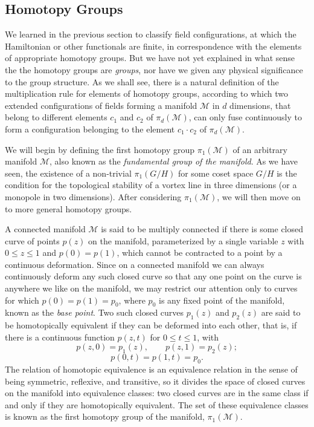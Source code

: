 \subsection{Homotopy Groups}
\label{sec:23.2}

We learned in the previous section to classify field configurations, at
which the Hamiltonian or other functionals are finite, in correspondence
with the elements of appropriate homotopy groups. But we have not yet
explained in what sense the the homotopy groups are \emph{groups}, nor have
we given any physical significance to the group structure. As we shall see,
there is a natural definition of the multiplication rule for elements of
homotopy groups, according to which two extended configurations of fields
forming a manifold $\mathcal M$ in $d$ dimensions, that belong to different
elements $c_1$ and $c_2$ of $\pi_d(\mathcal M)$, can only fuse continuously
to form a configuration belonging to the element $c_1\cdot c_2$ of
$\pi_d(\mathcal M)$.

We will begin by defining the first homotopy group $\pi_1(\mathcal M)$ of
an arbitrary manifold $\mathcal M$, also known as the \emph{fundamental
group of the manifold}. As we have seen, the existence of a non-trivial
$\pi_1(G/H)$ for some coset space $G/H$ is the condition for the
topological stability of a vortex line in three dimensions (or a monopole
in two dimensions). After considering $\pi_1(\mathcal M)$, we will then
move on to more general homotopy groups.

A connected manifold $\mathcal M$ is said to be multiply connected if
there is some closed curve of points $p(z)$ on the manifold, parameterized
by a single variable $z$ with $0\leq z\leq1$ and $p(0)=p(1)$, which cannot
be contracted to a point by a continuous deformation. Since on a connected
manifold we can always continuously deform any such closed curve so that
any one point on the curve is anywhere we like on the manifold, we may
restrict our attention only to curves for which
$p(0)=p(1)=p_0$, where $p_0$ is any fixed point of the manifold, known as
the \emph{base point}. Two such closed curves $p_1(z)$ and $p_2(z)$ are
said to be homotopically equivalent if they can be deformed into each
other, that is, if there is a continuous function $p(z,t)$ for
$0\leq t\leq1$, with
\[
 p(z,0)=p_1(z),\qquad p(z,1)=p_2(z);
\]
\[
 p(0,t)=p(1,t)=p_0.
\]
The relation of homotopic equivalence is an equivalence relation in the
sense of being symmetric, reflexive, and transitive, so it divides the
space of closed curves on the manifold into equivalence classes: two
closed curves are in the same class if and only if they are homotopically
equivalent. The set of these equivalence classes is known as the first
homotopy group of the manifold, $\pi_1(\mathcal M)$.


